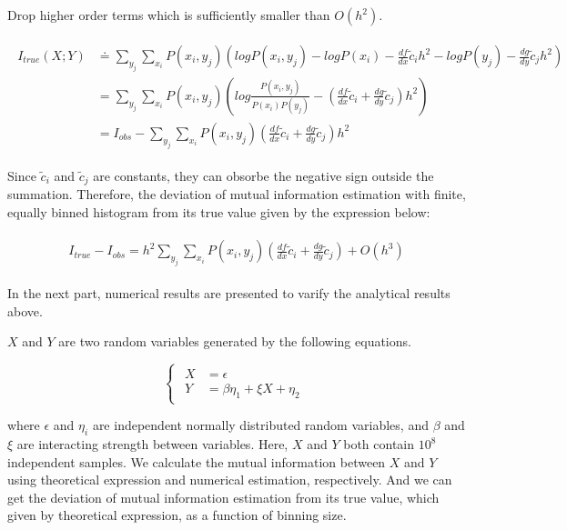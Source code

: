 \documentclass[paper=a4, fontsize=11pt]{article} %
\numberwithin{equation}{section} %
\numberwithin{figure}{section} %
\numberwithin{table}{section} %
\begin{document}
Drop higher order terms which is sufficiently smaller than $O(h^2)$.

\begin{align}
\begin{split}
	I_{true}(X;Y)	&\doteq \sum_{y_j}\sum_{x_i} P(x_i, y_j) (logP(x_i, y_j) - logP(x_i) - \frac{df}{dx}\tilde{c}_ih^2 - logP(y_j) - \frac{dg}{dy}\tilde{c}_jh^2) \\
	&= \sum_{y_j}\sum_{x_i}P(x_i, y_j)(log\frac{P(x_i, y_j)}{P(x_i)P(y_j)} - (\frac{df}{dx}\tilde{c}_i + \frac{dg}{dy}\tilde{c}_j)h^2) \\
	&= I_{obs} - \sum_{y_j}\sum_{x_i}P(x_i,y_j)(\frac{df}{dx}\tilde{c}_i + \frac{dg}{dy}\tilde{c}_j)h^2
\end{split}
\end{align}

Since $\tilde{c}_i$ and $\tilde{c}_j$ are constants, they can obsorbe the negative sign outside the summation. Therefore, the deviation of mutual information estimation with finite, equally binned histogram from its true value given by the expression below:

\begin{align}
	\begin{split}
		I_{true}	- I_{obs} = h^2\sum_{y_j}\sum_{x_i}P(x_i,y_j)(\frac{df}{dx}\tilde{c}_i + \frac{dg}{dy}\tilde{c}_j) + O(h^3)
	\end{split}
	\label{equ:gauss_mi}
\end{align}

In the next part, numerical results are presented to varify the analytical results above.

$X$ and $Y$ are two random variables generated by the following equations.

$$\left\{
\begin{aligned}
	\begin{split}
		X &= \epsilon \\
		Y &= \beta\eta_1 + \xi X + \eta_2
	\end{split}
\end{aligned}
\right.$$

where $\epsilon$ and $\eta_i$ are independent normally distributed random variables, and $\beta$ and $\xi$ are interacting strength between variables. Here, $X$ and $Y$ both contain $10^8$ independent samples. We calculate the mutual information between $X$ and $Y$ using theoretical expression and numerical estimation, respectively. And we can get the deviation of mutual information estimation from its true value, which given by theoretical expression, as a function of binning size.
\end{document}
